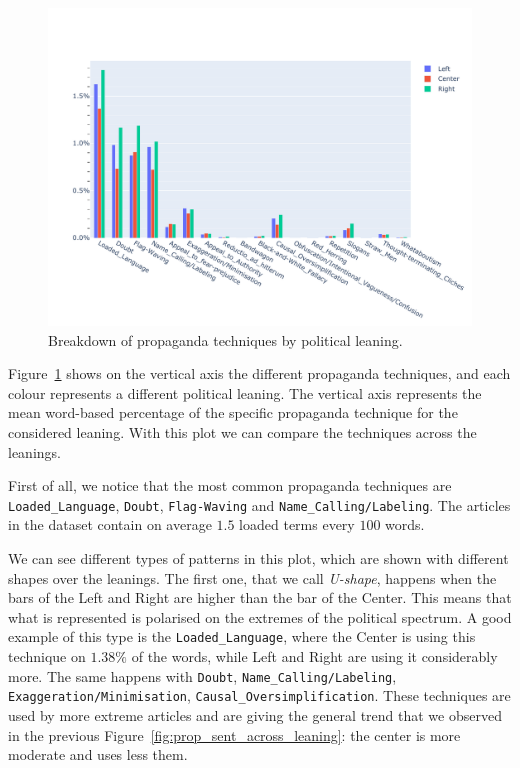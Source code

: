 \begin{figure}[!htbp]
    \centering
    \includegraphics[trim={0 0 0 2cm},clip,width=\linewidth]{figures/prop_tech_detail_across_leaning_baly.pdf}
    \caption{Breakdown of propaganda techniques by political leaning.}
    \label{fig:prop_tech_details_across_leaning}
\end{figure}

Figure~\ref{fig:prop_tech_details_across_leaning} shows on the vertical axis the different propaganda techniques, and each colour represents a different political leaning. The vertical axis represents the mean word-based percentage of the specific propaganda technique for the considered leaning.
With this plot we can compare the techniques across the leanings.

First of all, we notice that the most common propaganda techniques are \texttt{Loaded\_Language}, \texttt{Doubt}, \texttt{Flag-Waving} and \texttt{Name\_Calling/Labeling}.
The articles in the dataset contain on average $1.5$ loaded terms every $100$ words.

We can see different types of patterns in this plot, which are shown with different shapes over the leanings.
The first one, that we call \emph{U-shape}, happens when the bars of the Left and Right are higher than the bar of the Center. This means that what is represented is polarised on the extremes of the political spectrum.
A good example of this type is the \texttt{Loaded\_Language}, where the Center is using this technique on $1.38\%$ of the words, while Left and Right are using it considerably more.
The same happens with \texttt{Doubt}, \texttt{Name\_Calling/Labeling}, \texttt{Exaggeration/Minimisation}, \texttt{Causal\_Oversimplification}.
These techniques are used by more extreme articles and are giving the general trend that we observed in the previous Figure~\ref{fig:prop_sent_across_leaning}: the center is more moderate and uses less them.

